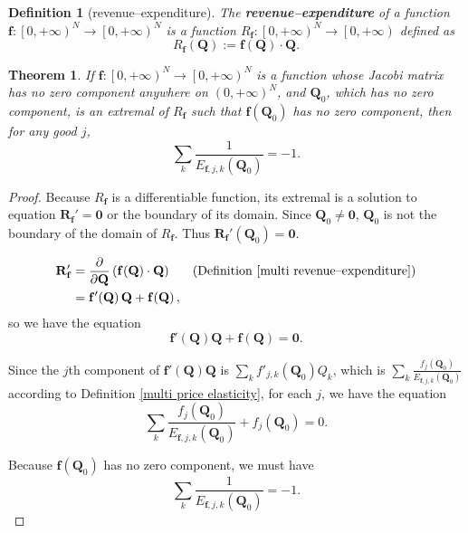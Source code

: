 \documentclass{article}
\newtheorem{theorem}{Theorem}[subsection]
\newtheorem{definition}{Definition}[subsection]
\begin{document}
\begin{definition}[revenue--expenditure]
\label{multi revenue--expenditure}
The \textbf{revenue--expenditure} of a function $\mathbf f:\left[0,+\infty\right)^N\to\left[0,+\infty\right)^N$ is a function $R_\mathbf f:\left[0,+\infty\right)^N\to\left[0,+\infty\right)$ defined as
$$R_\mathbf f\!\left(\mathbf Q\right):=\mathbf f\!\left(\mathbf Q\right)\cdot\mathbf Q.$$
\end{definition}

\begin{theorem}
If $\mathbf f:\left[0,+\infty\right)^N\to\left[0,+\infty\right)^N$ is a function whose Jacobi matrix has no zero component anywhere on $\left(0,+\infty\right)^N$, and $\mathbf Q_0$, which has no zero component, is an extremal of $R_\mathbf f$ such that $\mathbf f\!\left(\mathbf Q_0\right)$ has no zero component, then for any good $j$,
$$\sum_k\frac1{E_{\mathbf f,j,k}\!\left(\mathbf Q_0\right)}=-1.$$
\end{theorem}
\begin{proof}
Because $R_\mathbf f$ is a differentiable function, its extremal is a solution to equation $\mathbf R_\mathbf f'=\mathbf0$ or the boundary of its domain.
Since $\mathbf Q_0\ne\mathbf0$, $\mathbf Q_0$ is not the boundary of the domain of $R_\mathbf f$.
Thus $\mathbf R_\mathbf f'\!\left(\mathbf Q_0\right)=\mathbf0$.

\begin{align*}
\mathbf R_\mathbf f'&=\frac\partial{\partial\mathbf Q}\left(\mathbf f\!\left(\mathbf Q\right)\cdot\mathbf Q\right)&&\text{(Definition \ref{multi revenue--expenditure})}\\
&=\mathbf f'\!\left(\mathbf Q\right)\mathbf Q+\mathbf f\!\left(\mathbf Q\right),
\end{align*}
so we have the equation
$$\mathbf f'\!\left(\mathbf Q\right)\mathbf Q+\mathbf f\!\left(\mathbf Q\right)=\mathbf0.$$

Since the $j$th component of $\mathbf f'\!\left(\mathbf Q\right)\mathbf Q$ is $\sum_kf'_{j,k}\!\left(\mathbf Q_0\right)Q_k$, which is $\sum_k\frac{f_j\!\left(\mathbf Q_0\right)}{E_{\mathbf f,j,k}\!\left(\mathbf Q_0\right)}$ according to Definition \ref{multi price elasticity},
for each $j$, we have the equation
$$\sum_k\frac{f_j\!\left(\mathbf Q_0\right)}{E_{\mathbf f,j,k}\!\left(\mathbf Q_0\right)}+f_j\!\left(\mathbf Q_0\right)=0.$$

Because $\mathbf f\!\left(\mathbf Q_0\right)$ has no zero component,
we must have
$$\sum_k\frac1{E_{\mathbf f,j,k}\!\left(\mathbf Q_0\right)}=-1.$$
\end{proof}
\end{document}
